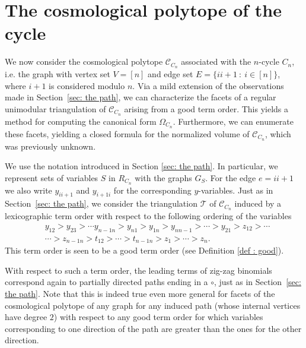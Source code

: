 \section{The cosmological polytope of the cycle}
\label{sec: the cycle}
We now consider the cosmological polytope $\mathcal{C}_{C_n}$ associated with the $n$-cycle $C_n$, i.e. the graph with vertex set $V = [n]$ and edge set $E=\{ii+1 ~:~ i\in [n]\}$, where $i+1$ is considered modulo $n$.
Via a mild extension of the observations made in Section~\ref{sec: the path}, we can characterize the facets of a regular unimodular triangulation of $\mathcal{C}_{C_n}$ arising from a good term order. 
This yields a method for computing the canonical form $\Omega_{C_n}$. 
Furthermore, we can enumerate these facets, yielding a closed formula for the normalized volume of $\mathcal{C}_{C_n}$, which was previously unknown. 

We use the notation introduced in Section \ref{sec: the path}. 
In particular, we represent sets of variables $S$ in $R_{C_n}$ with the graphs $G_S$.  
For the edge $e=ii+1$ we  also write $y_{ii+1}$ and $y_{i+1i}$ for the corresponding $y$-variables. 
Just as in Section~\ref{sec: the path}, we consider the triangulation $\mathcal{T}$ of $\mathcal{C}_{C_n}$ induced by a lexicographic term order with respect to the following ordering of the variables 
\begin{align}
    \label{eq: order cycle}
    &y_{12}>y_{23}>\cdots y_{n-1n}>y_{n1}>y_{1n}>y_{nn-1}>\cdots>y_{21} > z_{12} > \cdots \\
    &\cdots> z_{n-1n} > t_{12} > \cdots > t_{n-1n} > z_1 > \cdots > z_n \nonumber.
\end{align}
This term order is seen to be a good term order (see Definition \ref{def : good}).

With respect to such a term order, the leading terms of zig-zag binomials correspond again to partially directed paths ending in a $\circ$, just as in Section~\ref{sec: the path}.  
Note that this is indeed true even more general for facets of the cosmological polytope of any graph for any induced path (whose internal vertices have degree $2$) with respect to any good term order for which variables corresponding to one direction of the path are greater than the ones for the other direction. 

